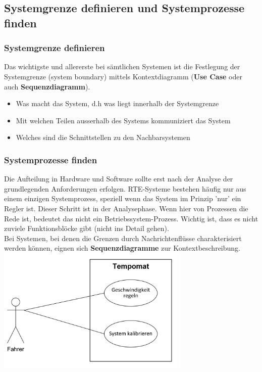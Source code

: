\subsection{Systemgrenze definieren und Systemprozesse finden}
\subsubsection{Systemgrenze definieren}
Das wichtigste und allererste bei sämtlichen Systemen ist die Festlegung der Systemgrenze (system boundary) mittels Kontextdiagramm (\textbf{Use Case} oder auch \textbf{Sequenzdiagramm}).
\begin{itemize}
	\item Was macht das System, d.h was liegt innerhalb der Systemgrenze
	\item Mit welchen Teilen ausserhalb des Systems kommuniziert das System
	\item Welches sind die Schnittstellen zu den Nachbarsystemen
\end{itemize}

\subsubsection{Systemprozesse finden}
\begin{multicols}{2}
Die Aufteilung in Hardware und Software sollte erst nach der Analyse der grundlegenden Anforderungen erfolgen. RTE-Systeme bestehen häufig nur aus einem einzigen Systemprozess, speziell wenn das System im Prinzip 'nur' ein Regler ist. Dieser Schritt ist in der Analysephase. Wenn hier von Prozessen die Rede ist, bedeutet das nicht ein Betriebssystem-Prozess. Wichtig ist, dass es nicht zuviele Funktionsblöcke gibt (nicht ins Detail gehen). \\
Bei Systemen, bei denen die Grenzen durch Nachrichtenflüsse charakterisiert werden können, eignen sich \textbf{Sequenzdiagramme} zur Kontextbeschreibung.\\
\vfill\null
\columnbreak
\includegraphics[height=6cm]{images/Modellierung/Systemgrenze}
\end{multicols}

